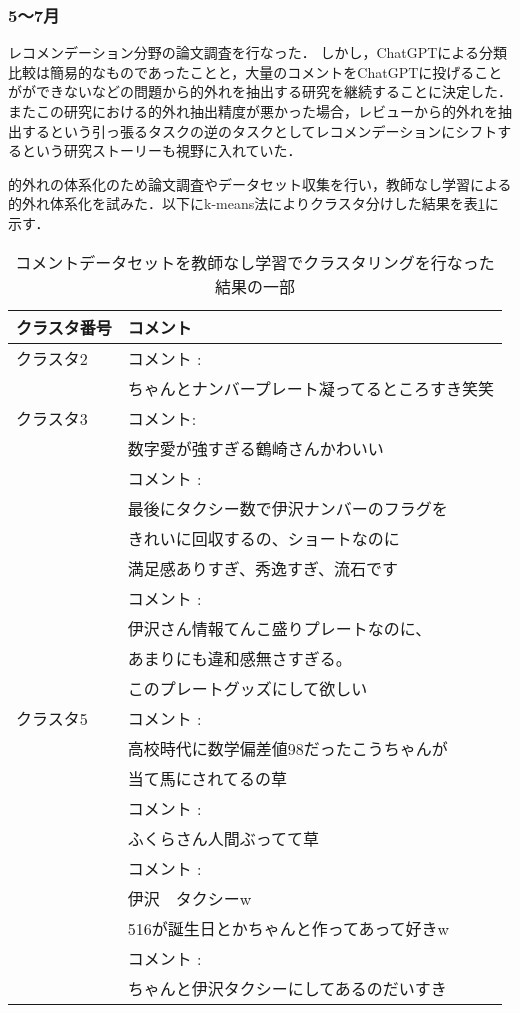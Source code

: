 \documentclass[platex,dvipdfmx,a4paper,twocolumn,base=10.5pt,jbase=10.5pt,ja=standard]{bxjsarticle}
\begin{document}
\subsubsection{5〜7月}
レコメンデーション分野の論文調査を行なった．
しかし，ChatGPTによる分類比較は簡易的なものであったことと，大量のコメントをChatGPTに投げることがができないなどの問題から的外れを抽出する研究を継続することに決定した．またこの研究における的外れ抽出精度が悪かった場合，レビューから的外れを抽出するという引っ張るタスクの逆のタスクとしてレコメンデーションにシフトするという研究ストーリーも視野に入れていた．\par
的外れの体系化のため論文調査やデータセット収集を行い，教師なし学習による的外れ体系化を試みた．以下にk-means法によりクラスタ分けした結果を表\ref{para1}に示す．\\
\begin{table}[H]
  \caption{コメントデータセットを教師なし学習でクラスタリングを行なった結果の一部}
  \label{para1}
  \scriptsize
  \centering
  \begin{tabular}{|l|l|}
    \hline
    クラスタ番号& コメント \\
    \hline
    クラスタ2   & コメント : \\
    &ちゃんとナンバープレート凝ってるところすき笑笑      \\
    \hline
    クラスタ3 & コメント: \\
    &数字愛が強すぎる鶴崎さんかわいい    \\
     & コメント : \\
     & 最後にタクシー数で伊沢ナンバーのフラグを\\
     &きれいに回収するの、ショートなのに\\
     &満足感ありすぎ、秀逸すぎ、流石です\\
     &コメント : \\
     &伊沢さん情報てんこ盛りプレートなのに、\\
     &あまりにも違和感無さすぎる。\\
     &このプレートグッズにして欲しい\\     
    \hline
    クラスタ5&コメント :  \\
    &高校時代に数学偏差値98だったこうちゃんが\\
    &当て馬にされてるの草\\
    &コメント : \\
    &ふくらさん人間ぶってて草\\
    &コメント : \\
    &伊沢　タクシーw\\
    &516が誕生日とかちゃんと作ってあって好きw\\
    &コメント : \\
    &ちゃんと伊沢タクシーにしてあるのだいすき\\
  
    \hline
    \end{tabular}
\end{table}
\end{document}
